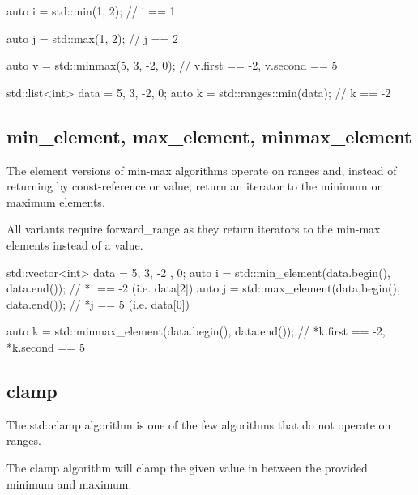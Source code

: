 \begin{box-note}
\begin{cppcode}
auto i = std::min(1, 2);
// i == 1

auto j = std::max(1, 2);
// j == 2

auto v = std::minmax({5, 3, -2, 0});
// v.first == -2, v.second == 5

std::list<int> data = {5, 3, -2, 0};
auto k = std::ranges::min(data);
// k == -2
\end{cppcode}
\end{box-note}

\subsection{min\_element, max\_element, minmax\_element}

The element versions of min-max algorithms operate on ranges and, instead of returning by const-reference or value, return an iterator to the minimum or maximum elements.



All variants require forward\_range as they return iterators to the min-max elements instead of a value.

\begin{box-note}
\begin{cppcode}
std::vector<int> data = { 5, 3, -2 , 0};
auto i = std::min_element(data.begin(), data.end());
// *i == -2 (i.e. data[2])
auto j = std::max_element(data.begin(), data.end());
// *j == 5 (i.e. data[0])

auto k = std::minmax_element(data.begin(), data.end());
// *k.first == -2, *k.second == 5
\end{cppcode}
\end{box-note}

\subsection{clamp}

The std::clamp algorithm is one of the few algorithms that do not operate on ranges.


The clamp algorithm will clamp the given value in between the provided minimum and maximum:

